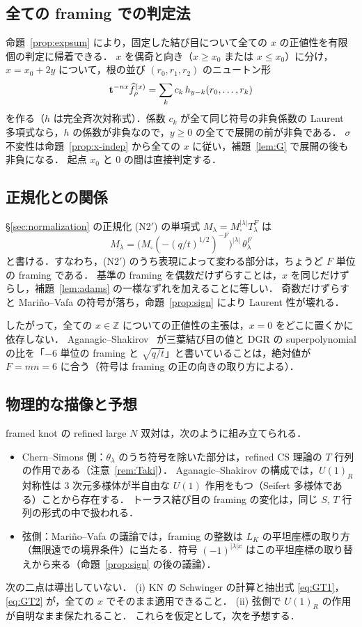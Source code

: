\subsection{全ての framing での判定法}\label{sec:newton}
命題~\ref{prop:expsum} により，固定した結び目について全ての $x$ の正値性を有限個の判定に帰着できる．
$x$ を偶奇と向き（$x\ge x_0$ または $x\le x_0$）に分け，$x=x_0+2y$ について，根の並び $(r_0,r_1,r_2)$ のニュートン形
\[
\mathbf{t}^{-nx}\widehat{f}^{(x)}_\rho=\sum_{k}c_k\,h_{y-k}(r_0,\dots,r_k)
\]
を作る（$h$ は完全斉次対称式）．係数 $c_k$ が全て同じ符号の非負係数の Laurent 多項式なら，$h$ の係数が非負なので，$y\ge0$ の全てで展開の前が非負である．
$\sigma$ 不変性は命題~\ref{prop:x-indep} から全ての $x$ に従い，補題~\ref{lem:G} で展開の後も非負になる．
起点 $x_0$ と 0 の間は直接判定する．

\subsection{正規化との関係}\label{sec:N2-framing}
\begin{proposition}\label{prop:N2-framing}
\S\ref{sec:normalization} の正規化 (N2$'$) の単項式 $M_\lambda=M_\square^{|\lambda|}T_\lambda^F$ は
\[
M_\lambda=\bigl(M_\square(-(q/t)^{1/2})^{-F}\bigr)^{|\lambda|}\,\theta_\lambda^F
\]
と書ける．すなわち，(N2$'$) のうち表現によって変わる部分は，ちょうど $F$ 単位の framing である．
基準の framing を偶数だけずらすことは，$x$ を同じだけずらし，補題~\ref{lem:adams} の一様なずれを加えることに等しい．
奇数だけずらすと Mariño--Vafa の符号が落ち，命題~\ref{prop:sign} により Laurent 性が壊れる．
\end{proposition}
したがって，全ての $x\in\mathbb{Z}$ についての正値性の主張は，$x=0$ をどこに置くかに依存しない．
Aganagic--Shakirov~\cite{Aganagic11} が三葉結び目の値と DGR の superpolynomial の比を「$-6$ 単位の framing と $\sqrt{q/t}$」と書いていることは，絶対値が $F=mn=6$ に合う（符号は framing の正の向きの取り方による）．

\subsection{物理的な描像と予想}\label{sec:physics}
framed knot の refined large $N$ 双対は，次のように組み立てられる．
\begin{itemize}
\item Chern--Simons 側：$\theta_\lambda$ のうち符号を除いた部分は，refined CS 理論の $T$ 行列の作用である（注意~\ref{rem:Taki}）．
Aganagic--Shakirov の構成では，$U(1)_R$ 対称性は 3 次元多様体が半自由な $U(1)$ 作用をもつ（Seifert 多様体である）ことから存在する．
トーラス結び目の framing の変化は，同じ $S$, $T$ 行列の形式の中で扱われる．
\item 弦側：Mariño--Vafa の議論では，framing の整数は $L_K$ の平坦座標の取り方（無限遠での境界条件）に当たる．符号 $(-1)^{|\lambda|x}$ はこの平坦座標の取り替えから来る（命題~\ref{prop:sign} の後の議論）．
\end{itemize}
次の二点は導出していない．
(i) KN の Schwinger の計算と抽出式 \eqref{eq:GT1}，\eqref{eq:GT2} が，全ての $x$ でそのまま適用できること．
(ii) 弦側で $U(1)_R$ の作用が自明なまま保たれること．
これらを仮定として，次を予想する．


